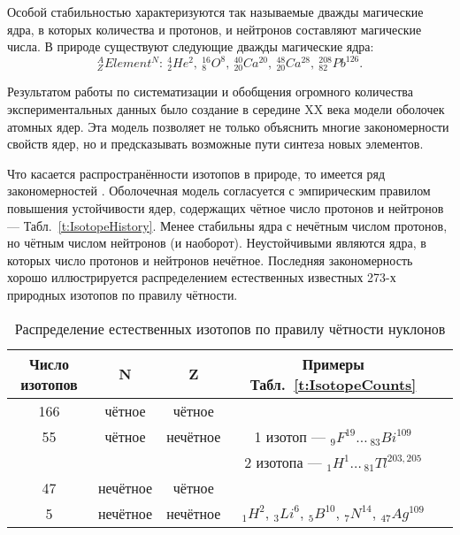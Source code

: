 \documentclass[a5paper,openany]{book}
\begin{document}
 Особой стабильностью характеризуются так называемые дважды магические ядра, в которых количества и протонов, и нейтронов составляют магические числа. В природе существуют следующие дважды магические ядра: 
 \begin{equation*}
^A_Z Element ^N :  \ ^4_2He^2, \ ^{16}_8O^8, \ ^{40}_{20}Ca^{20}, \ ^{48}_{20}Ca^{28}, \ ^{208}_{82}Pb^{126}.
 \end{equation*}




Результатом работы по систематизации и обобщения огромного
количества экспериментальных данных было создание в середине XX века
модели оболочек атомных ядер.   
Эта модель позволяет не только объяснить многие закономерности свойств ядер, но и предсказывать возможные пути синтеза новых элементов.

Что касается распространённости изотопов в природе, то имеется ряд закономерностей \cite{Bekman}.
Оболочечная модель согласуется с эмпирическим правилом повышения устойчивости ядер,
содержащих чётное число протонов и нейтронов --- Табл.~\ref{t:IsotopeHistory}. Менее стабильны ядра с нечётным числом протонов, но
чётным числом нейтронов (и наоборот). Неустойчивыми являются ядра, в которых число протонов и
нейтронов нечётное. Последняя закономерность хорошо иллюстрируется распределением естественных
известных 273-х природных изотопов по правилу чётности. 

\begin{table}[!h]
{\small 
\begin{center}
\begin{tabular}{|c|c|c|c|c|}
	\hline
	Число изотопов & N & Z & Примеры Табл.~\ref{t:IsotopeCounts}\\
	\hline
	166 & чётное & чётное & ~ \\
	55 & чётное & нечётное & 1 изотоп --- $_{9}F^{19} \ldots \, _{83}Bi^{109} $ \\
	~ & ~ & ~ &  2 изотопа --- $_{1}H^{1}  \ldots \, _{81}Tl^{203, 205}   $ \\
	47 & нечётное & чётное & ~  \\
	5 & нечётное & нечётное & $_{1}H^{2},   \,  _{3}Li^{6},  \,  _{5}B^{10},   \, _{7}N^{14},  \,  _{47}Ag^{109} $   \\
	\hline
\end{tabular}
\end{center}	
}	
\caption{Распределение естественных изотопов по правилу чётности нуклонов}
\label{t:IsotopeOddEven}
\end{table}
\end{document}
